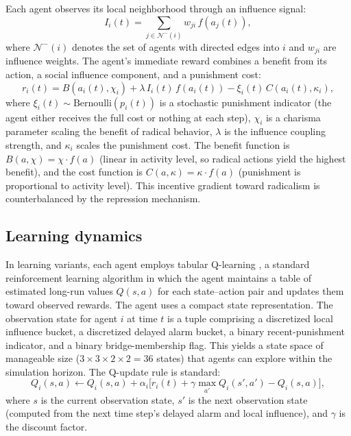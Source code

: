 Each agent observes its local neighborhood through an influence signal:
\begin{equation}
    I_i(t)=\sum_{j\in\mathcal{N}^{-}(i)} w_{ji}\, f(a_j(t)),
\end{equation}
where $\mathcal{N}^{-}(i)$ denotes the set of agents with directed edges into $i$ and $w_{ji}$ are influence weights. The agent's immediate reward combines a benefit from its action, a social influence component, and a punishment cost:
\begin{equation}
    r_i(t)=B(a_i(t),\chi_i)+\lambda\, I_i(t)\,f(a_i(t))-\xi_i(t)\,C(a_i(t),\kappa_i),
\end{equation}
where $\xi_i(t)\sim\mathrm{Bernoulli}(p_i(t))$ is a stochastic punishment indicator (the agent either receives the full cost or nothing at each step), $\chi_i$ is a charisma parameter scaling the benefit of radical behavior, $\lambda$ is the influence coupling strength, and $\kappa_i$ scales the punishment cost. The benefit function is $B(a,\chi) = \chi \cdot f(a)$ (linear in activity level, so radical actions yield the highest benefit), and the cost function is $C(a,\kappa) = \kappa \cdot f(a)$ (punishment is proportional to activity level). This incentive gradient toward radicalism is counterbalanced by the repression mechanism.

\subsection{Learning dynamics}

In learning variants, each agent employs tabular Q-learning \citep{sutton2018reinforcement}, a standard reinforcement learning algorithm in which the agent maintains a table of estimated long-run values $Q(s,a)$ for each state--action pair and updates them toward observed rewards. The agent uses a compact state representation. The observation state for agent $i$ at time $t$ is a tuple comprising a discretized local influence bucket, a discretized delayed alarm bucket, a binary recent-punishment indicator, and a binary bridge-membership flag. This yields a state space of manageable size ($3 \times 3 \times 2 \times 2 = 36$ states) that agents can explore within the simulation horizon. The Q-update rule is standard:
\[
Q_i(s,a) \leftarrow Q_i(s,a) + \alpha_i\bigl[r_i(t) + \gamma \max_{a'} Q_i(s',a') - Q_i(s,a)\bigr],
\]
where $s$ is the current observation state, $s'$ is the next observation state (computed from the next time step's delayed alarm and local influence), and $\gamma$ is the discount factor.

